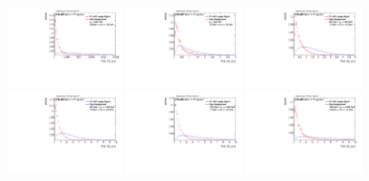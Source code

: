 \begin{figure}
\includegraphics[width=0.3\textwidth]{sascha_input/Appendix/Distributions/w/distributions/beta2/h_assisted_tj_C2_2_bin6.pdf} 
\bigskip
\includegraphics[width=0.3\textwidth]{sascha_input/Appendix/Distributions/w/distributions/beta2/h_assisted_tj_D2_2_bin1.pdf} \hspace{1mm}
\includegraphics[width=0.3\textwidth]{sascha_input/Appendix/Distributions/w/distributions/beta2/h_assisted_tj_D2_2_bin2.pdf} \hspace{1mm}
\includegraphics[width=0.3\textwidth]{sascha_input/Appendix/Distributions/w/distributions/beta2/h_assisted_tj_D2_2_bin3.pdf} 
\bigskip
\includegraphics[width=0.3\textwidth]{sascha_input/Appendix/Distributions/w/distributions/beta2/h_assisted_tj_D2_2_bin4.pdf} \hspace{1mm}
\includegraphics[width=0.3\textwidth]{sascha_input/Appendix/Distributions/w/distributions/beta2/h_assisted_tj_D2_2_bin5.pdf} \hspace{1mm}

\end{figure}
